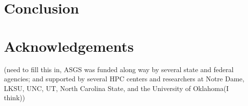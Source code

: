 \documentclass{article}
\begin{document}
\section{Conclusion}

\section{Acknowledgements} (need to fill this in, ASGS was funded along way by
several state and federal agencies; and supported by several HPC centers and
researchers at Notre Dame, LKSU, UNC, UT, North Carolina State, and the
University of Oklahoma(I think))

\break

\end{document}
